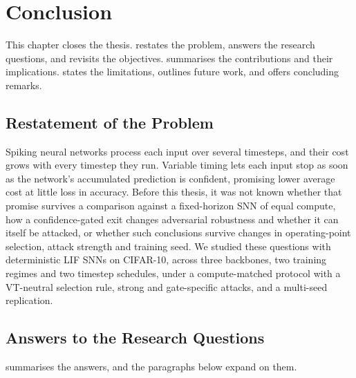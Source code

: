 \chapter{Conclusion}
\label{ch:conclusion}

This chapter closes the thesis.  restates the problem,  answers the research questions, and  revisits the objectives.  summarises the contributions and  their implications.  states the limitations,  outlines future work, and  offers concluding remarks.

\section{Restatement of the Problem}
\label{sec:con-restate}

Spiking neural networks process each input over several timesteps, and their cost grows with every timestep they run. Variable timing lets each input stop as soon as the network's accumulated prediction is confident, promising lower average cost at little loss in accuracy. Before this thesis, it was not known whether that promise survives a comparison against a fixed-horizon SNN of equal compute, how a confidence-gated exit changes adversarial robustness and whether it can itself be attacked, or whether such conclusions survive changes in operating-point selection, attack strength and training seed. We studied these questions with deterministic LIF SNNs on CIFAR-10, across three backbones, two training regimes and two timestep schedules, under a compute-matched protocol with a VT-neutral selection rule, strong and gate-specific attacks, and a multi-seed replication.

\section{Answers to the Research Questions}
\label{sec:con-rqs}

 summarises the answers, and the paragraphs below expand on them.

